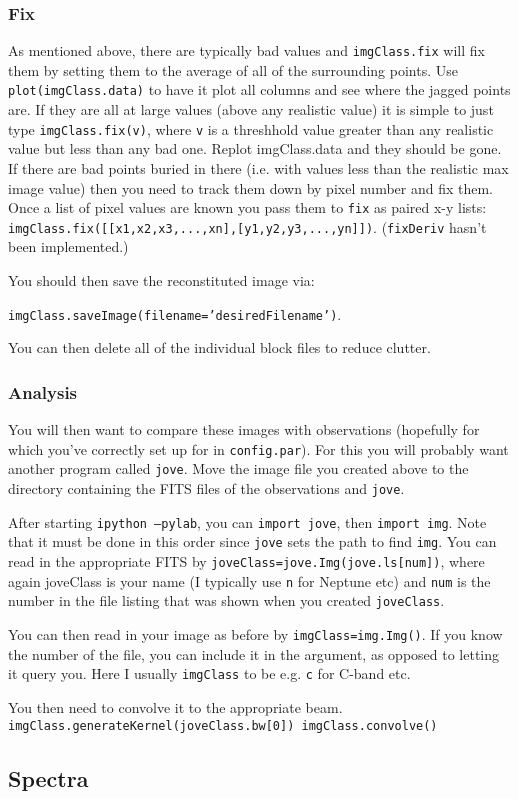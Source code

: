 \documentclass[11pt]{article}
\begin{document}
\subsubsection{Fix}
As mentioned above, there are typically bad values and \texttt{imgClass.fix} will fix them by setting them to the average of all of the surrounding points.
Use \texttt{plot(imgClass.data)} to have it plot all columns and see where the jagged points are.  If they are all at large values (above any realistic value) it is simple to just type \texttt{imgClass.fix(v)}, where \texttt{v} is a threshhold value greater than any realistic value but less than any bad one.  Replot imgClass.data and they should be gone.  If there are bad points buried in there (i.e. with values less than the realistic max image value) then you need to track them down by pixel number and fix them.  Once a list of pixel values are known you pass them to \texttt{fix} as paired x-y lists:  \texttt{imgClass.fix([[x1,x2,x3,...,xn],[y1,y2,y3,...,yn]])}.  
(\texttt{fixDeriv} hasn't been implemented.)

You should then save the reconstituted image via: 

\texttt{imgClass.saveImage(filename='desiredFilename')}.

\noindent
You can then delete all of the individual block files to reduce clutter.

\subsubsection{Analysis}
You will then want to compare these images with observations (hopefully for which you've correctly set up for in \texttt{config.par}).  For this you will probably want another program called \texttt{jove}.  Move the image file you created above to the directory containing the FITS files of the observations and \texttt{jove}.

After starting \texttt{ipython --pylab}, you can \texttt{import jove}, then \texttt{import img}.  Note that it must be done in this order since \texttt{jove} sets the path to find \texttt{img}.   You can read in the appropriate FITS by \texttt{joveClass=jove.Img(jove.ls[num])}, where again joveClass is your name (I typically use \texttt{n} for Neptune etc) and \texttt{num} is the number in the file listing that was shown when you created \texttt{joveClass}.

You can then read in your image as before by \texttt{imgClass=img.Img()}.  If you know the number of the file, you can include it in the argument, as opposed to letting it query you.  Here I usually \texttt{imgClass} to be e.g. \texttt{c} for C-band etc.

You then need to convolve it to the appropriate beam.
\texttt{
imgClass.generateKernel(joveClass.bw[0])
imgClass.convolve()
}

\subsection{Spectra}




\end{document}
